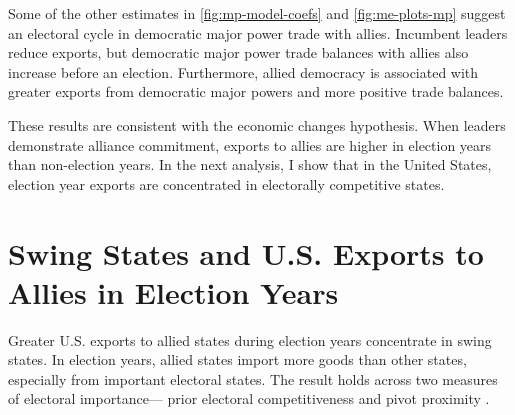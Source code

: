 \documentclass[12pt]{article}
\begin{document}
Some of the other estimates in \autoref{fig:mp-model-coefs} and \autoref{fig:me-plots-mp} suggest an electoral cycle in democratic major power trade with allies.
Incumbent leaders reduce exports, but democratic major power trade balances with allies also increase before an election.
Furthermore, allied democracy is associated with greater exports from democratic major powers and more positive trade balances.


These results are consistent with the economic changes hypothesis. 
When leaders demonstrate alliance commitment, exports to allies are higher in election years than non-election years.
In the next analysis, I show that in the United States, election year exports are concentrated in electorally competitive states.



\section{Swing States and U.S. Exports to Allies in Election Years}


Greater U.S. exports to allied states during election years concentrate in swing states.
In election years, allied states import more goods than other states, especially from important electoral states.
The result holds across two measures of electoral importance--- prior electoral competitiveness and pivot proximity \citep{Wright2009}.
\end{document}
